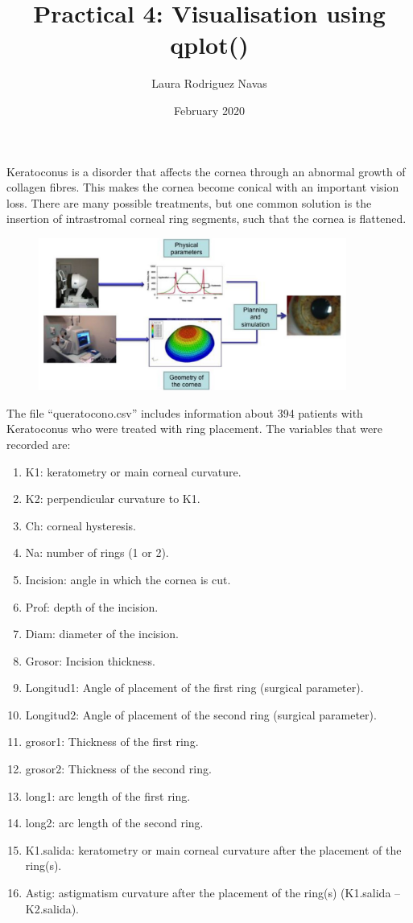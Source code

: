 \documentclass[]{article}
\title{Practical 4: Visualisation using qplot()}
\author{Laura Rodriguez Navas}
\date{February 2020}
\providecommand{\tightlist}{%
  \setlength{\itemsep}{0pt}\setlength{\parskip}{0pt}}
\begin{document}
\maketitle

Keratoconus is a disorder that affects the cornea through an abnormal
growth of collagen fibres. This makes the cornea become conical with an
important vision loss. There are many possible treatments, but one
common solution is the insertion of intrastromal corneal ring segments,
such that the cornea is flattened.

\begin{figure}
	\centering
	\includegraphics[width=0.9\textwidth]{img.png}
\end{figure}

The file ``queratocono.csv'' includes information about 394 patients
with Keratoconus who were treated with ring placement. The variables
that were recorded are:

\begin{enumerate}
\def\labelenumi{\arabic{enumi}.}
\tightlist
\item
  K1: keratometry or main corneal curvature.
\item
  K2: perpendicular curvature to K1.
\item
  Ch: corneal hysteresis.
\item
  Na: number of rings (1 or 2).
\item
  Incision: angle in which the cornea is cut.
\item
  Prof: depth of the incision.
\item
  Diam: diameter of the incision.
\item
  Grosor: Incision thickness.
\item
  Longitud1: Angle of placement of the first ring (surgical parameter).
\item
  Longitud2: Angle of placement of the second ring (surgical parameter).
\item
  grosor1: Thickness of the first ring.
\item
  grosor2: Thickness of the second ring.
\item
  long1: arc length of the first ring.
\item
  long2: arc length of the second ring.
\item
  K1.salida: keratometry or main corneal curvature after the placement
  of the ring(s).
\item
  Astig: astigmatism curvature after the placement of the ring(s)
  (K1.salida -- K2.salida).
\end{enumerate}
\end{document}
